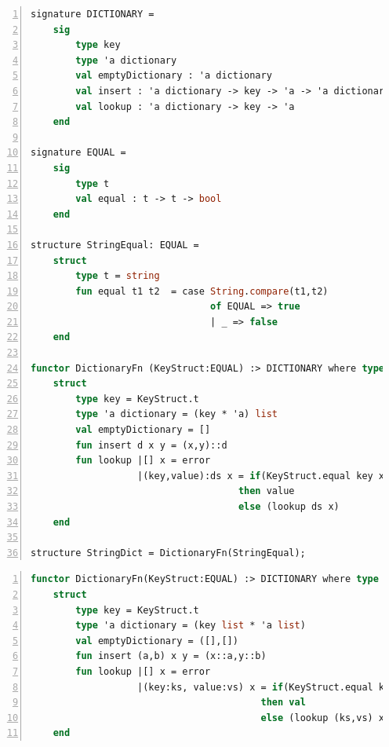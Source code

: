\begin{lstlisting}[frame=single,numbers=left, language=ML, caption={[Dictionary Functor Example]A generic dictionary that can take any type of the EQUAL typeclass as its key.},
label=code:DictionaryFunctor, morekeywords={where}]
signature DICTIONARY =
    sig
        type key
        type 'a dictionary
        val emptyDictionary : 'a dictionary
        val insert : 'a dictionary -> key -> 'a -> 'a dictionary
        val lookup : 'a dictionary -> key -> 'a
    end

signature EQUAL =
    sig
        type t
        val equal : t -> t -> bool
    end

structure StringEqual: EQUAL = 
    struct
        type t = string
        fun equal t1 t2  = case String.compare(t1,t2)
                                of EQUAL => true
                                | _ => false
    end
    
functor DictionaryFn (KeyStruct:EQUAL) :> DICTIONARY where type key = KeyStruct.t =
    struct
        type key = KeyStruct.t
        type 'a dictionary = (key * 'a) list
        val emptyDictionary = []
        fun insert d x y = (x,y)::d
        fun lookup |[] x = error
                   |(key,value):ds x = if(KeyStruct.equal key x)
                                     then value
                                     else (lookup ds x)
    end
    
structure StringDict = DictionaryFn(StringEqual);
\end{lstlisting}

\begin{lstlisting}[frame=single,numbers=left, language=ML, caption={[Alternative Dictionary Functor]The alternative implementations of the dictionary.},
label=code:DictionaryFunctorAlternative, morekeywords={where}, basicstyle=\ttfamily]
functor DictionaryFn(KeyStruct:EQUAL) :> DICTIONARY where type key = KeyStruct.t =
    struct
        type key = KeyStruct.t
        type 'a dictionary = (key list * 'a list)
        val emptyDictionary = ([],[])
        fun insert (a,b) x y = (x::a,y::b)
        fun lookup |[] x = error
                   |(key:ks, value:vs) x = if(KeyStruct.equal key x)
                                         then val
                                         else (lookup (ks,vs) x)
    end
\end{lstlisting}

